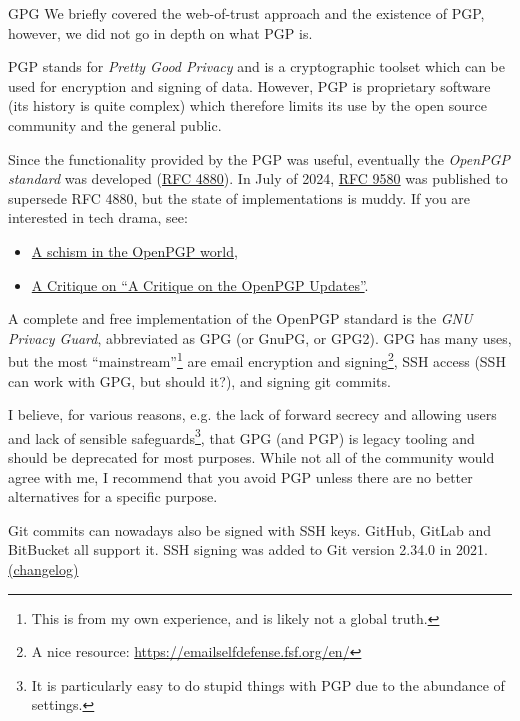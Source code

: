 \documentclass{homework}
\begin{document}
\begin{task}{GPG}
  We briefly covered the web-of-trust approach and the existence of PGP, however, we did not go in depth on what PGP is.

  PGP stands for \emph{Pretty Good Privacy} and is a cryptographic toolset which can be used for encryption and signing of data.
  However, PGP is proprietary software (its history is quite complex) which therefore limits its use by the open source community and the general public.

  Since the functionality provided by the PGP was useful, eventually the \emph{OpenPGP standard} was developed (\href{https://datatracker.ietf.org/doc/html/rfc4880}{RFC 4880}).
  In July of 2024, \href{https://datatracker.ietf.org/doc/html/rfc9580}{RFC 9580} was published to supersede RFC 4880, but the state of implementations is muddy.
  If you are interested in tech drama, see:
  \begin{itemize}
    \item \href{https://lwn.net/Articles/953797/}{A schism in the OpenPGP world},
    \item \href{https://blog.pgpkeys.eu/critique-critique.html}{A Critique on \enquote{A Critique on the OpenPGP Updates}}.
  \end{itemize}

  A complete and free implementation of the OpenPGP standard is the \emph{GNU Privacy Guard}, abbreviated as GPG (or GnuPG, or GPG2).
  GPG has many uses, but the most \enquote{mainstream}\footnote{This is from my own experience, and is likely not a global truth.} are email encryption and signing\footnote{A nice resource: \url{https://emailselfdefense.fsf.org/en/}}, SSH access (SSH can work with GPG, but should it?), and signing git commits\footnotemark{}.

  \begin{tcolorbox}
    I believe, for various reasons, e.g. the lack of forward secrecy and allowing users and lack of sensible safeguards\footnote{It is particularly easy to do stupid things with PGP due to the abundance of settings.}, that GPG (and PGP) is legacy tooling and should be deprecated for most purposes.
    While not all of the community would agree with me, I recommend that you avoid PGP unless there are no better alternatives for a specific purpose.
  \end{tcolorbox}

  \begin{tcolorbox}
    Git commits can nowadays also be signed with SSH keys.
    GitHub, GitLab and BitBucket all support it.
    SSH signing was added to Git version 2.34.0 in 2021.
    \href{https://github.com/git/git/blob/master/Documentation/RelNotes/2.34.0.txt}{(changelog)}
  \end{tcolorbox}


\end{task}
\end{document}
